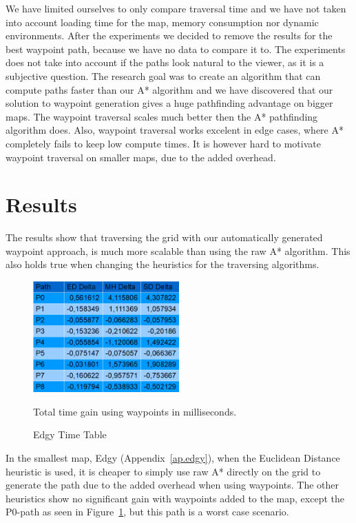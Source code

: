 \documentclass[a4paper]{article}
\begin{document}
We have limited ourselves to only compare traversal time and we have not taken into account loading time for the map, memory consumption nor dynamic environments. After the experiments we decided to remove the results for the best waypoint path, because we have no data to compare it to. The experiments does not take into account if the paths look natural to the viewer, as it is a subjective question. The research goal was to create an algorithm that can compute paths faster than our A* algorithm and we have discovered that our solution to waypoint generation gives a huge pathfinding advantage on bigger maps. The waypoint traversal scales much better then the A* pathfinding algorithm does. Also, waypoint traversal works excelent in edge cases, where A* completely fails to keep low compute times. It is however hard to motivate waypoint traversal on smaller maps, due to the added overhead.

\section{Results}
The results show that traversing the grid with our automatically generated waypoint approach, is much more scalable than using the raw A* algorithm. This also holds true when changing the heuristics for the traversing algorithms.
\begin{figure}[h!]
\centering
\includegraphics[width=0.5\textwidth,height=\textheight,keepaspectratio]{ChartsAndFigures/Edgy_timeTable.png}
\caption{Edgy Time Table}
Total time gain using waypoints in milliseconds.
\label{fig:Edgy_cd}
\end{figure}
In the smallest map, Edgy (Appendix~\ref{ap.edgy}), when the Euclidean Distance heuristic is used, it is cheaper to simply use raw A* directly on the grid to generate the path due to the added overhead when using waypoints. The other heuristics show no significant gain with waypoints added to the map, except the P0-path as seen in Figure~\ref{fig:Edgy_cd}, but this path is a worst case scenario.
	
\end{document}
